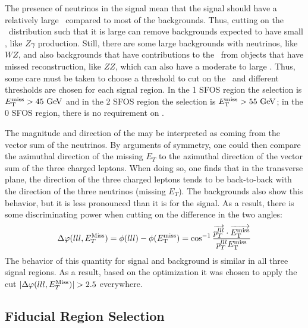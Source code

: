 The presence of neutrinos in the signal mean that the signal should have a 
relatively large \MET~compared to most of the backgrounds. Thus, 
cutting on the \MET~distribution such that it is large can remove backgrounds
expected to have small \MET, like $Z\gamma$ production.
Still, there are some large backgrounds with neutrinos, like $WZ$, 
and also backgrounds that have contributions to the \MET~from objects that have
missed reconstruction, like $ZZ$, which can also have a moderate to large \MET.
Thus, some care must be taken to choose a threshold to cut on the \MET~and
different thresholds are chosen for each signal 
region.
In the 1 SFOS region the selection is  $\MET > 45\GeV$
and in the 2 SFOS region the selection is $\MET > 55\GeV$;
in the 0 SFOS region, 
there is no requirement on \MET.

The magnitude and direction
of the \MET may be interpreted as coming from the 
vector sum of the neutrinos.  By arguments of 
symmetry, one could then compare the azimuthal direction 
of the missing $E_{T}$ to the azimuthal direction of the vector
sum of the three charged leptons. When doing so, one finds that 
in the transverse plane, 
the direction of the three charged leptons
tends to be back-to-back with the direction of the 
three neutrinos (missing $E_{T}$). The
backgrounds also show this behavior, but it is less pronounced than 
it is for the signal.  As a result, 
there is some discriminating power when cutting on the difference 
in the two angles: 
\begin{equation}
\Delta\varphi(lll,E_{T}^{\textrm{Miss}}) = \phi(lll)-\phi(E_{\mathrm{T}}^{\mathrm{miss}}) = \cos^{-1}\frac{ \overrightarrow{p_{T}^{lll}}\cdot\overrightarrow{E_{\mathrm{T}}^{\mathrm{miss}}} }{ p_{T}^{lll}E_{\mathrm{T}}^{\mathrm{miss}} } 
\end{equation}
The behavior of this quantity for signal and
background is similar in all three signal regions.
As a result, based on the 
optimization it was chosen to apply the cut
$|\Delta\varphi(lll,E_{T}^{\textrm{Miss}})| > 2.5$ everywhere.  



\subsection{Fiducial Region Selection}
\label{sec:fiducial}

